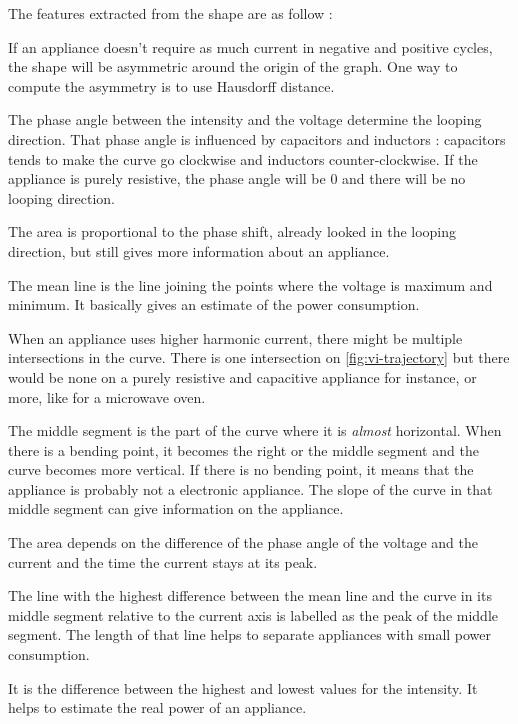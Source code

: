 The features extracted from the shape are as follow \cite{lam2007novel}:
\begin{description}[align=left]
\item[Asymmetry] If an appliance doesn't require as much current in negative and positive cycles, the shape will be asymmetric around the origin of the graph. One way to compute the asymmetry is to use Hausdorff distance.
\item[Looping direction] The phase angle between the intensity and the voltage determine the looping direction. That phase angle is influenced by capacitors and inductors : capacitors tends to make the curve go clockwise and inductors counter-clockwise. If the appliance is purely resistive, the phase angle will be 0 and there will be no looping direction.
\item[Area] The area is proportional to the phase shift, already looked in the looping direction, but still gives more information about an appliance.
\item[Slope of mean line] The mean line is the line joining the points where the voltage is maximum and minimum. It basically gives an estimate of the power consumption.
\item[Self-intersection] When an appliance uses higher harmonic current, there might be multiple intersections in the curve. There is one intersection on \autoref{fig:vi-trajectory} but there would be none on a purely resistive and capacitive appliance for instance, or more, like for a microwave oven. 
\item[Slope of middle segment] The middle segment is the part of the curve where it is \textit{almost} horizontal. When there is a bending point, it becomes the right or the middle segment and the curve becomes more vertical. If there is no bending point, it means that the appliance is probably not a electronic appliance. The slope of the curve in that middle segment can give information on the appliance.
\item[Area of left and right segments] The area depends on the difference of the phase angle of the voltage and the current and the time the current stays at its peak.
\item[Peak of middle segment] The line with the highest difference between the mean line and the curve in its middle segment relative to the current axis is labelled as the peak of the middle segment. The length of that line helps to separate appliances with small power consumption.
\item[Span] It is the difference between the highest and lowest values for the intensity. It helps to estimate the real power of an appliance.
\end{description}

